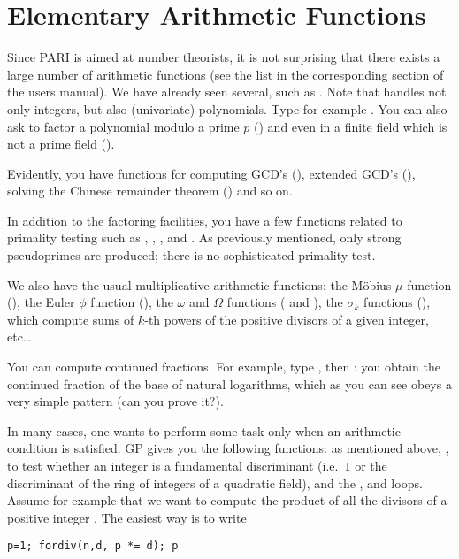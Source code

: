 \section{Elementary Arithmetic Functions}

Since PARI is aimed at number theorists, it is not surprising that there
exists a large number of arithmetic functions (see the list in the
corresponding section of the users manual). We have already seen several,
such as . Note that  handles not only integers, but
also (univariate) polynomials. Type for example .
You can also ask to factor a polynomial modulo a prime $p$ ()
and even in a finite field which is not a prime field ().

Evidently, you have functions for computing GCD's (), extended GCD's
(), solving the Chinese remainder theorem () and so
on.

In addition to the factoring facilities, you have a few functions related to
primality testing such as , ,
, and . As previously mentioned, only strong
pseudoprimes are produced; there is no sophisticated primality test.

We also have the usual multiplicative arithmetic functions: the M\"obius $\mu$
function (), the Euler $\phi$ function (), the
$\omega$ and $\Omega$ functions ( and ), the
$\sigma_k$ functions (), which compute sums of $k$-th powers of the
positive divisors of a given integer, etc\dots

You can compute continued fractions. For example, type , then
: you obtain the continued fraction of the base of
natural logarithms, which as you can see obeys a very simple pattern (can you
prove it?).

In many cases, one wants to perform some task only when an arithmetic
condition is satisfied. GP gives you the following functions: 
as mentioned above, ,  to test whether an
integer is a fundamental discriminant (i.e.~$1$ or the discriminant of the
ring of integers of a quadratic field), and the , 
and  loops. Assume for example that we want to compute the
product of all the divisors of a positive integer . The easiest way is
to write

\centerline{\tt p=1; fordiv(n,d, p *= d); p }

